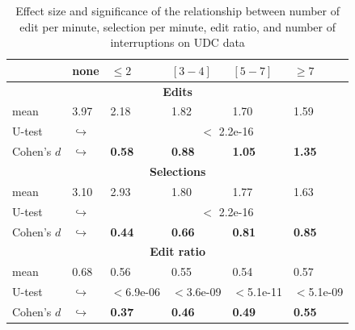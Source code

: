 \documentclass[times]{smrauth}
\begin{document}
\begin{table}[ht!]
\tiny
\renewcommand{\arraystretch}{1.3}
\caption{Effect size and significance of the relationship between number of edit per minute, selection per minute, edit ratio, and number of interruptions on UDC data} 
\label{tbl:p_value_udc}
\centering
\begin{tabular}{l | p{0.75cm} | p{1cm} | p{1cm} | p{1cm} |p{1cm}} 

   & none & $\leq 2$ & $[3 - 4]$ & $[5 - 7]$ & $\geq 7$  \\  
  \hline
  \multicolumn{6}{c}{\textbf{Edits}} \\
  \hline
  mean & 3.97 &	2.18 & 1.82 & 1.70 & 1.59 \\ 
   \cline{3-6} 
  U-test & $\hookrightarrow$ & \multicolumn{4}{c}{$<$ 2.2e-16} \\
  \cline{3-6} 
  Cohen's $d$ & $\hookrightarrow$	& \textbf{0.58} & \textbf{0.88} & \textbf{1.05} & \textbf{1.35}    \\
  \hline
  
  
  \multicolumn{6}{c}{\textbf{Selections}} \\
  \hline 
  mean & 3.10 &	2.93 & 1.80 & 1.77 & 1.63  \\ 
     \cline{3-6} 
    U-test & $\hookrightarrow$ & \multicolumn{4}{c}{$<$ 2.2e-16} \\
    
  \cline{3-6} 
  Cohen's $d$ & $\hookrightarrow$	& \textbf{0.44} & \textbf{0.66} & \textbf{0.81} & \textbf{0.85} \\  
\hline


  \multicolumn{6}{c}{\textbf{Edit ratio}} \\
  \hline 
  mean & 0.68 & 0.56 & 0.55 & 0.54 & 0.57 \\ 
  \cline{3-6} 
     \cline{3-6} 
    U-test & $\hookrightarrow$ & $<$6.9e-06 & $<$3.6e-09 & $<$5.1e-11 & $<$5.1e-09  \\
    \cline{3-6} 
    Cohen's $d$ & $\hookrightarrow$ & \textbf{0.37} & \textbf{0.46} & \textbf{0.49} & \textbf{0.55} \\ 
\hline

\end{tabular}
\end{table}
\end{document}
